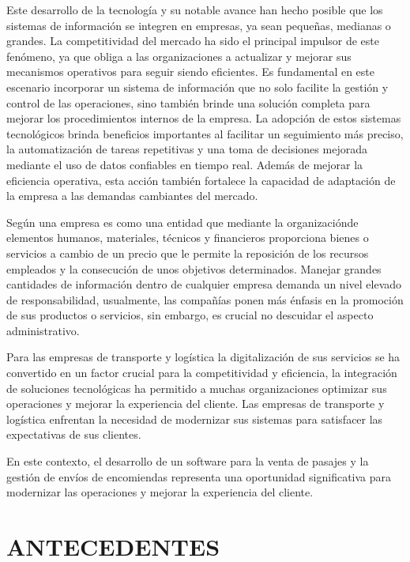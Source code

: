 \documentclass[12pt,letterpaper]{article}
\begin{document}
Este desarrollo de la tecnología y su notable avance han hecho posible que los sistemas de información se integren en empresas, ya sean pequeñas, medianas o grandes. La competitividad del mercado ha sido el principal impulsor de este fenómeno, ya que obliga a las organizaciones a actualizar y mejorar sus mecanismos operativos para seguir siendo eficientes. Es fundamental en este escenario incorporar un sistema de información que no solo facilite la gestión y control de las operaciones, sino también brinde una solución completa para mejorar los procedimientos internos de la empresa. La adopción de estos sistemas tecnológicos brinda beneficios importantes al facilitar un seguimiento más preciso, la automatización de tareas repetitivas y una toma de decisiones mejorada mediante el uso de datos confiables en tiempo real. Además de mejorar la eficiencia operativa, esta acción también fortalece la capacidad de adaptación de la empresa a las demandas cambiantes del mercado.

Según \textcite{casanueva2000practicas} una empresa es como una entidad que mediante la organizaciónde elementos humanos, materiales, técnicos y financieros proporciona bienes o servicios a cambio de un precio que le permite la reposición de los recursos empleados y la consecución de unos objetivos determinados. Manejar grandes cantidades de información dentro de cualquier empresa demanda un nivel elevado de responsabilidad, usualmente, las compañías ponen más énfasis en la promoción de sus productos o servicios, sin embargo, es crucial no descuidar el aspecto administrativo.

Para las empresas de transporte y logística la digitalización de sus servicios se ha convertido en un factor crucial para la competitividad y eficiencia, la integración de soluciones tecnológicas ha permitido a muchas organizaciones optimizar sus operaciones y mejorar la experiencia del cliente. Las empresas de transporte y logística enfrentan la necesidad de modernizar sus sistemas para satisfacer las expectativas de sus clientes. 

En este contexto, el desarrollo de un software para la venta de pasajes y la gestión de envíos de encomiendas representa una oportunidad significativa para modernizar las operaciones y mejorar la experiencia del cliente.

\section{ANTECEDENTES}
\end{document}
